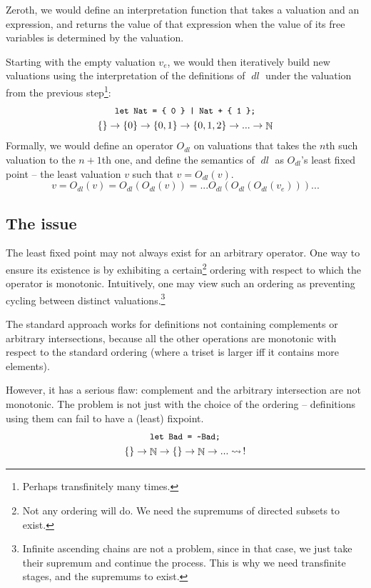 \documentclass[oneside,12pt]{book}
\theoremstyle{definition}
\theoremstyle{remark}
\newcommand{\tde}{\raisebox{0.5ex}{\texttildelow}}
\newcommand\var[1]{\mathop{\mathit{#1}}\nolimits}
\newcommand{\dl}{\var{dl}}
\newcommand{\Nat}{\var{\mathbb{N}}}
\begin{document}
Zeroth, we would define an interpretation function that takes
a valuation and an expression, and returns the value of that expression
when the value of its free variables is determined by the valuation.

Starting with the empty valuation $v_e$, we would then iteratively build new valuations
using the interpretation of the definitions of $\dl$ under the valuation from
the previous step\footnote{Perhaps transfinitely many times.}:
\begin{gather*}
  \texttt{\small let Nat = \{ 0 \} | Nat + \{ 1 \};} \\
  \{\} \rightarrow \{ 0 \} \rightarrow \{ 0, 1 \} \rightarrow \{ 0, 1, 2 \}
    \rightarrow ... \rightarrow \Nat
\end{gather*}
Formally, we would define an operator $O_{\dl}$ on valuations that takes the $n$th
such valuation to the $n+1$th one, and define the semantics of $\dl$ as $O_{\dl}$'s
least fixed point -- the least valuation $v$ such that $v = O_{\dl}(v)$.
\[v = O_{\dl}(v) = O_{\dl}(O_{\dl}(v)) = ...O_{\dl}(O_{\dl}(O_{\dl}(v_e)))...\]

\subsection{The issue}
The least fixed point may not always exist for an arbitrary operator. One way
to ensure its existence is by exhibiting a certain\footnote{Not any
ordering will do. We need the supremums of directed subsets to exist.} ordering
with respect to which the operator is monotonic.
Intuitively, one may view such an ordering as preventing cycling between distinct
valuations.\footnote{Infinite ascending chains are not a problem, since in that case,
we just take their supremum and continue the process. This is why we need
transfinite stages, and the supremums to exist.}

The standard approach works for definitions not containing complements
or arbitrary intersections, because all the other operations are monotonic
with respect to the standard ordering (where a triset is larger iff it contains
more elements).

However, it has a serious flaw: complement and the arbitrary
intersection are not monotonic. The problem is not just with the choice
of the ordering -- definitions using them can fail to have a (least) fixpoint.
\begin{gather*}
  \texttt{\small let Bad = \tde Bad;} \\
  \{\} \rightarrow \Nat \rightarrow \{\} \rightarrow \Nat
    \rightarrow ... \rightsquigarrow~\!!
\end{gather*}
\end{document}
